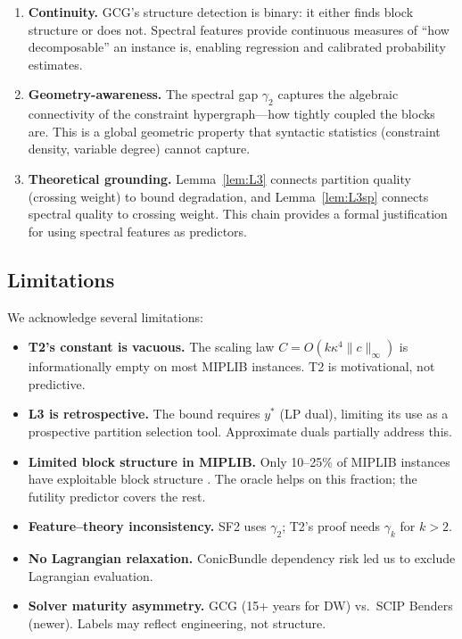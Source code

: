 \documentclass[12pt]{article}
\begin{document}
\begin{enumerate}
\item \textbf{Continuity.}  GCG's structure detection is binary: it either
  finds block structure or does not.  Spectral features provide continuous
  measures of ``how decomposable'' an instance is, enabling regression and
  calibrated probability estimates.

\item \textbf{Geometry-awareness.}  The spectral gap $\gamma_2$ captures
  the algebraic connectivity of the constraint hypergraph---how tightly
  coupled the blocks are.  This is a global geometric property that
  syntactic statistics (constraint density, variable degree) cannot capture.

\item \textbf{Theoretical grounding.}  Lemma~\ref{lem:L3} connects
  partition quality (crossing weight) to bound degradation, and
  Lemma~\ref{lem:L3sp} connects spectral quality to crossing weight.
  This chain provides a formal justification for using spectral features
  as predictors.
\end{enumerate}

\subsection{Limitations}

We acknowledge several limitations:

\begin{itemize}
\item \textbf{T2's constant is vacuous.}  The scaling law $C = O(k \kappa^4 \|c\|_\infty)$
  is informationally empty on most MIPLIB instances.  T2 is motivational,
  not predictive.

\item \textbf{L3 is retrospective.}  The bound requires $y^*$ (LP dual),
  limiting its use as a prospective partition selection tool.  Approximate
  duals partially address this.

\item \textbf{Limited block structure in MIPLIB.}  Only 10--25\% of MIPLIB
  instances have exploitable block structure \citep{bergner2015automatic}.
  The oracle helps on this fraction; the futility predictor covers the rest.

\item \textbf{Feature--theory inconsistency.}  SF2 uses $\gamma_2$;
  T2's proof needs $\gamma_k$ for $k > 2$.

\item \textbf{No Lagrangian relaxation.}  ConicBundle dependency risk
  led us to exclude Lagrangian evaluation.

\item \textbf{Solver maturity asymmetry.}  GCG (15+ years for DW) vs.\
  SCIP Benders (newer).  Labels may reflect engineering, not structure.
\end{itemize}
\end{document}
